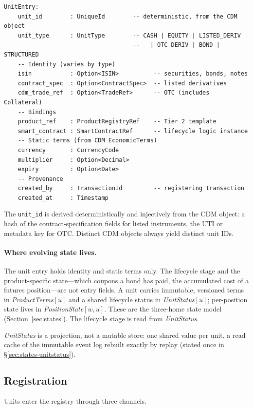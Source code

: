 \documentclass[11pt,a4paper]{article}
\begin{document}
\begin{lstlisting}
UnitEntry:
    unit_id        : UniqueId        -- deterministic, from the CDM object
    unit_type      : UnitType        -- CASH | EQUITY | LISTED_DERIV
                                     --   | OTC_DERIV | BOND | STRUCTURED
    -- Identity (varies by type)
    isin           : Option<ISIN>          -- securities, bonds, notes
    contract_spec  : Option<ContractSpec>  -- listed derivatives
    cdm_trade_ref  : Option<TradeRef>      -- OTC (includes Collateral)
    -- Bindings
    product_ref    : ProductRegistryRef    -- Tier 2 template
    smart_contract : SmartContractRef      -- lifecycle logic instance
    -- Static terms (from CDM EconomicTerms)
    currency       : CurrencyCode
    multiplier     : Option<Decimal>
    expiry         : Option<Date>
    -- Provenance
    created_by     : TransactionId         -- registering transaction
    created_at     : Timestamp
\end{lstlisting}

The \texttt{unit\_id} is derived deterministically and injectively from the CDM object: a hash of the contract-specification fields for listed instruments, the UTI or metadata key for OTC. Distinct CDM objects always yield distinct unit IDs.

\paragraph{Where evolving state lives.}
The unit entry holds identity and static terms only. The lifecycle stage and the product-specific state---which coupons a bond has paid, the accumulated cost of a futures position---are not entry fields. A unit carries immutable, versioned terms in \emph{ProductTerms}$[u]$ and a shared lifecycle status in \emph{UnitStatus}$[u]$; per-position state lives in \emph{PositionState}$[w,u]$. These are the three-home state model (Section~\ref{sec:states}). The lifecycle stage is read from \emph{UnitStatus}.

\emph{UnitStatus} is a projection, not a mutable store: one shared value per unit, a read cache of the immutable event log rebuilt exactly by replay (stated once in \S\ref{sec:states-unitstatus}).

\subsection{Registration}
\label{sec:unit-registration}

Units enter the registry through three channels.
\end{document}
